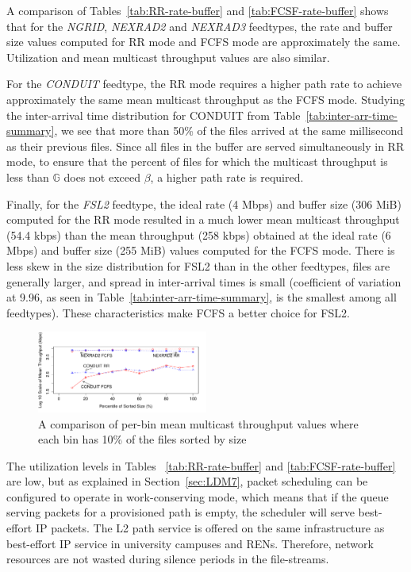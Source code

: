 A comparison of Tables~\ref{tab:RR-rate-buffer} and \ref{tab:FCSF-rate-buffer} shows that for the \emph{NGRID}, \emph{NEXRAD2} and \emph{NEXRAD3} feedtypes, the rate and buffer size values computed for RR mode and FCFS mode are approximately the same. Utilization and mean multicast throughput values are also similar.

For the \emph{CONDUIT} feedtype, the RR mode requires a higher path rate to achieve approximately
the same mean multicast throughput as the FCFS mode. Studying the inter-arrival time
distribution for CONDUIT from Table~\ref{tab:inter-arr-time-summary}, we see
that more than 50\% of the files arrived at the same millisecond as their previous files. Since all files in the buffer are served simultaneously in RR mode, to ensure
that the percent of files for which the multicast throughput is less than $\mathbb{G}$ does not exceed $\beta$, a higher path rate is required.

Finally, for the \emph{FSL2} feedtype, the ideal rate (4 Mbps) and buffer size (306 MiB) computed for the RR mode resulted in a much lower mean multicast throughput (54.4 kbps) than the mean
throughput (258 kbps) obtained at the ideal rate (6 Mbps) and buffer
size (255 MiB) values computed for the FCFS mode.
There is less skew in
the size distribution for FSL2 than in the other feedtypes, files are
generally larger, and spread in inter-arrival times is small (coefficient
of variation at 9.96, as seen in Table~\ref{tab:inter-arr-time-summary}, is the smallest among all feedtypes). These characteristics
make FCFS a better choice for FSL2.

\begin{figure}
\centering               \includegraphics[width=0.5\textwidth]{figures/FCFS-vs-RR.pdf}
\caption{A comparison of per-bin mean multicast throughput values where each bin has 10\% of the files sorted by size}
\label{fig:FCFS-vs-RR}
\end{figure}

The utilization levels in Tables ~\ref{tab:RR-rate-buffer} and \ref{tab:FCSF-rate-buffer} are low, but as explained in Section~\ref{sec:LDM7}, packet scheduling
can be configured to operate in work-conserving mode, which means
that if the queue serving packets for a provisioned path is empty, the scheduler
will serve best-effort IP packets. The L2 path service is offered
on the same infrastructure as best-effort IP service in university campuses
and RENs. Therefore, network resources are not wasted during silence periods in the file-streams.

